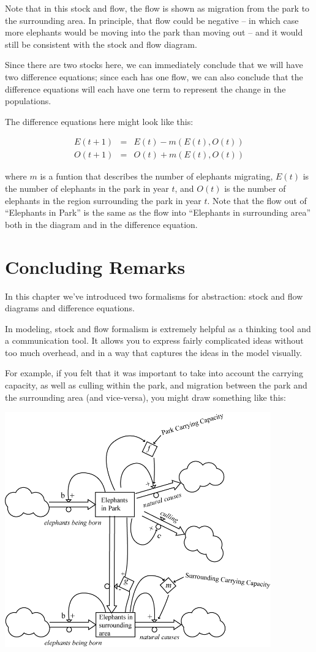 Note that in this stock and flow, the flow is shown as migration from the park to the surrounding area.  In principle, that flow could be negative -- in which case more elephants would be moving into the park than moving out -- and it would still be consistent with the stock and flow diagram.  

Since there are two stocks here, we can immediately conclude that we will have two difference equations; since each has one flow, we can also conclude that the difference equations will each have one term to represent the change in the populations.

The difference equations here might look like this:

\begin{eqnarray*}
E(t+1) &=& E(t) -m(E(t),O(t)) \\
O(t+1) &=& O(t) +m(E(t),O(t))
\end{eqnarray*}

where $m$ is a funtion that describes the number of elephants migrating, $E(t)$ is the number of elephants in the park in year $t$, and $O(t)$ is the number of elephants in the region surrounding the park in year $t$.  Note that the flow out of ``Elephants in Park'' is the same as the flow into ``Elephants in surrounding area'' both in the diagram and in the difference equation.

\section{Concluding Remarks}

In this chapter we've introduced two formalisms for abstraction: stock and flow diagrams and difference equations.  

In modeling, stock and flow formalism is extremely helpful as a thinking tool and a communication tool.  It allows you to express fairly complicated ideas without too much overhead, and in a way that captures the ideas in the model visually.  

For example, if you felt that it was important to take into account the carrying capacity, as well as culling within the park, and migration between the park and the surrounding area (and vice-versa), you might draw something like this:

 \includegraphics[height=4in]{figs/ElephantStockAndFlow3}

